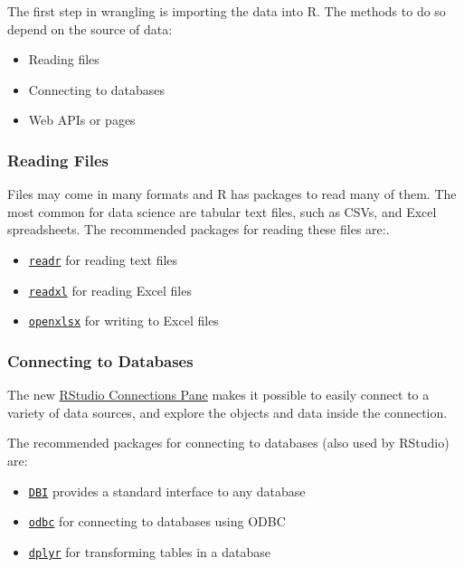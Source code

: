 \documentclass[]{book}
\providecommand{\tightlist}{%
  \setlength{\itemsep}{0pt}\setlength{\parskip}{0pt}}
\theoremstyle{definition}
\theoremstyle{definition}
\theoremstyle{definition}
\theoremstyle{remark}
\begin{document}
The first step in wrangling is importing the data into R. The methods to
do so depend on the source of data:

\begin{itemize}
\tightlist
\item
  Reading files
\item
  Connecting to databases
\item
  Web APIs or pages
\end{itemize}

\subsubsection{Reading Files}\label{reading-files}

Files may come in many formats and R has packages to read many of them.
The most common for data science are tabular text files, such as CSVs,
and Excel spreadsheets. The recommended packages for reading these files
are:.

\begin{itemize}
\tightlist
\item
  \href{http://readr.tidyverse.org/}{\texttt{readr}} for reading text
  files
\item
  \href{http://readxl.tidyverse.org/}{\texttt{readxl}} for reading Excel
  files
\item
  \href{https://www.rdocumentation.org/packages/openxlsx/}{\texttt{openxlsx}}
  for writing to Excel files
\end{itemize}

\subsubsection{Connecting to Databases}\label{connecting-to-databases}

The new \href{https://db.rstudio.com/}{RStudio Connections Pane} makes
it possible to easily connect to a variety of data sources, and explore
the objects and data inside the connection.

The recommended packages for connecting to databases (also used by
RStudio) are:

\begin{itemize}
\tightlist
\item
  \href{https://db.rstudio.com/DBI}{\texttt{DBI}} provides a standard
  interface to any database
\item
  \href{https://db.rstudio.com/odbc/}{\texttt{odbc}} for connecting to
  databases using ODBC
\item
  \href{https://db.rstudio.com/dplyr/}{\texttt{dplyr}} for transforming
  tables in a database
\end{itemize}
\end{document}
